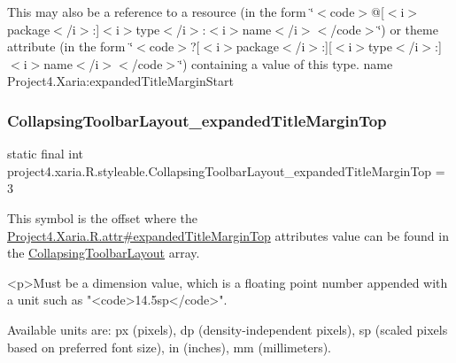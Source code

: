 This may also be a reference to a resource (in the form \char`\"{}$<$code$>$@\mbox{[}$<$i$>$package$<$/i$>$\+:\mbox{]}$<$i$>$type$<$/i$>$\+:$<$i$>$name$<$/i$>$$<$/code$>$\char`\"{}) or theme attribute (in the form \char`\"{}$<$code$>$?\mbox{[}$<$i$>$package$<$/i$>$\+:\mbox{]}\mbox{[}$<$i$>$type$<$/i$>$\+:\mbox{]}$<$i$>$name$<$/i$>$$<$/code$>$\char`\"{}) containing a value of this type.  name Project4.\+Xaria\+:expanded\+Title\+Margin\+Start \mbox{\label{classproject4_1_1xaria_1_1R_1_1styleable_acac04a3f2f5421067c31e2d58d3df10d}} 
\subsubsection{\texorpdfstring{Collapsing\+Toolbar\+Layout\+\_\+expanded\+Title\+Margin\+Top}{CollapsingToolbarLayout\_expandedTitleMarginTop}}
{\footnotesize\ttfamily static final int project4.\+xaria.\+R.\+styleable.\+Collapsing\+Toolbar\+Layout\+\_\+expanded\+Title\+Margin\+Top = 3\hspace{0.3cm}{\ttfamily [static]}}

This symbol is the offset where the \hyperlink{}{Project4.\+Xaria.\+R.\+attr\#expanded\+Title\+Margin\+Top} attribute\textquotesingle{}s value can be found in the \hyperlink{classproject4_1_1xaria_1_1R_1_1styleable_ac131ed2b7e0e7f05b58231242478b839}{Collapsing\+Toolbar\+Layout} array.

\begin{DoxyVerb}      <p>Must be a dimension value, which is a floating point number appended with a unit such as "<code>14.5sp</code>".
\end{DoxyVerb}
 Available units are\+: px (pixels), dp (density-\/independent pixels), sp (scaled pixels based on preferred font size), in (inches), mm (millimeters). 

